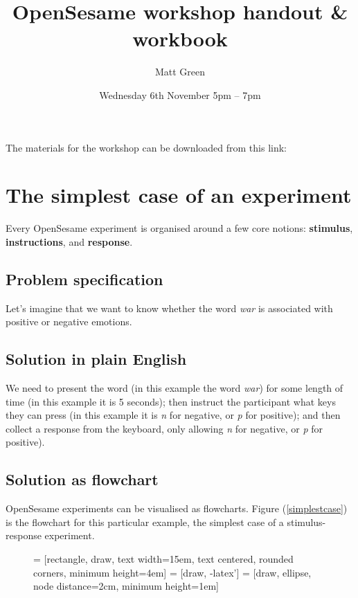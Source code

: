 \documentclass[a4paper]{tufte-handout}
\title{OpenSesame workshop handout \& workbook}
\date{Wednesday 6th November 5pm -- 7pm} %
\author{Matt Green}
\begin{document}

\maketitle
The materials for the workshop can be downloaded from this link: \href{https://github.com/mjgreen/opensesame_workshop_BU/archive/master.zip}
\tableofcontents

\section{The simplest case of an experiment}
Every OpenSesame experiment is organised around a few core notions: \textbf{stimulus}, \textbf{instructions}, and \textbf{response}.

\subsection{Problem specification}
Let's imagine that we want to know whether the word \emph{war} is associated with positive or negative emotions.

\subsection{Solution in plain English}
We need to present the word (in this example the word \emph{war}) for some length of time (in this example it is 5 seconds); then instruct the participant what keys they can press (in this example it is \emph{n} for negative, or \emph{p} for positive); and then collect a response from the keyboard, only allowing \emph{n} for negative, or \emph{p} for positive).

\subsection{Solution as flowchart}
OpenSesame experiments can be visualised as flowcharts. Figure (\ref{simplestcase}) is the flowchart for this particular example, the simplest case of a stimulus-response experiment.
\begin{figure}[!htbp]
\centering
{} = [rectangle, draw, text width=15em, text centered, rounded corners, minimum height=4em]
 = [draw, -latex']
 = [draw, ellipse, node distance=2cm, minimum height=1em]
\end{figure}
\end{document}
